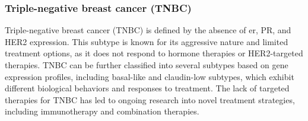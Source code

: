 \subsubsection{Triple-negative breast cancer (TNBC)}
Triple-negative breast cancer (TNBC) is defined by the absence of \gls{er}, PR,
and HER2 expression.
This subtype is known for its aggressive nature and limited treatment options,
as it does not respond to hormone therapies or HER2-targeted
therapies\supercite{sizemore_triple_2021}.
TNBC can be further classified into several subtypes based on gene expression
profiles, including basal-like and claudin-low subtypes, which exhibit
different biological behaviors and responses to
treatment\supercite{lehmann_identification_2011}.
The lack of targeted therapies for TNBC has led to ongoing research into novel
treatment strategies, including immunotherapy and combination
therapies\supercite{lehmann_identification_2011}.

